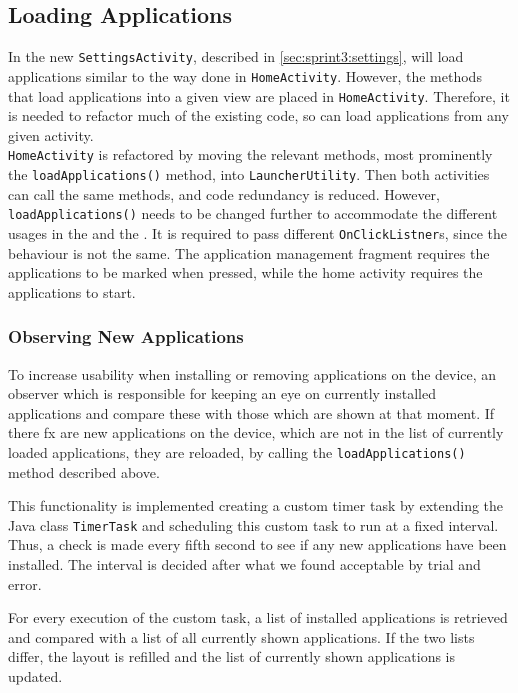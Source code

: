 \subsection{Loading Applications}\label{sect:sprint3:refactoring}
In the new \lstinline!SettingsActivity!, described in \cref{sec:sprint3:settings}, \launcher will load applications similar to the way done in \lstinline|HomeActivity|.
However, the methods that load applications into a given view are placed in \lstinline!HomeActivity!.
Therefore, it is needed to refactor much of the existing code, so \launcher can load applications from any given activity.\\

\lstinline!HomeActivity! is refactored by moving the relevant methods, most prominently the \lstinline|loadApplications()| method, into \lstinline!LauncherUtility!.
Then both activities can call the same methods, and code redundancy is reduced. 
However, \lstinline|loadApplications()| needs to be changed further to accommodate the different usages in the \homeactivity and the \settingsactivity. 
It is required to pass different \lstinline|OnClickListner|s, since the behaviour is not the same.
The application management fragment requires the applications to be marked when pressed, while the home activity requires the applications to start.

\subsubsection{Observing New Applications}\label{sec:sprint3:observing}
To increase usability when installing or removing applications on the device, an observer which is responsible for keeping an eye on currently installed applications and compare these with those which are shown at that moment. 
If there fx are new applications on the device, which are not in the list of currently loaded applications, they are reloaded, by calling the \lstinline|loadApplications()| method described above.

This functionality is implemented creating a custom timer task by extending the Java class \lstinline!TimerTask! and scheduling this custom task to run at a fixed interval. 
Thus, a check is made every fifth second to see if any new applications have been installed.
The interval is decided after what we found acceptable by trial and error.

For every execution of the custom task, a list of installed applications is retrieved and compared with a list of all currently shown applications.
If the two lists differ, the layout is refilled and the list of currently shown applications is updated.